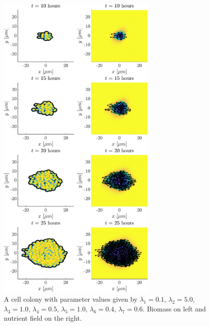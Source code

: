 \begin{figure}[!htb] %
    \centering
    \includegraphics[width= 0.7\textwidth]{
        chapter2/figures/t_all__L1_0o10_L2_5o00_L3_1o00_L4_0o50_L5_1o00_L6_0o40_L7_0o60.pdf}
    \caption{A cell colony with parameter values given by
             $\lambda_1 = 0.1$,  
             $\lambda_2 = 5.0$, 
             $\lambda_3 = 1.0$, 
             $\lambda_4 = 0.5$, 
             $\lambda_5 = 1.0$, 
             $\lambda_6 = 0.4$, 
             $\lambda_7 = 0.6$. 
             Biomass on left and nutrient field on the right.}
    \label{fig: sdsd}
\end{figure}

